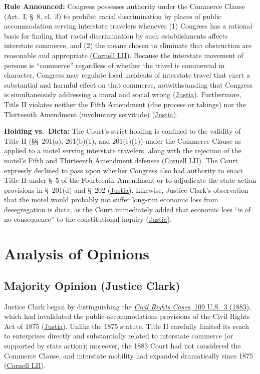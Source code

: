 \documentclass[12pt]{article}
\begin{document}
\textbf{Rule Announced:} Congress possesses authority under the Commerce Clause (Art.\ I, \S~8, cl.\ 3) to prohibit racial discrimination by places of public accommodation serving interstate travelers whenever (1) Congress has a rational basis for finding that racial discrimination by such establishments affects interstate commerce, and (2) the means chosen to eliminate that obstruction are reasonable and appropriate (\href{https://www.law.cornell.edu/supremecourt/text/379/241}{Cornell LII}). Because the interstate movement of persons is ``commerce'' regardless of whether the travel is commercial in character, Congress may regulate local incidents of interstate travel that exert a substantial and harmful effect on that commerce, notwithstanding that Congress is simultaneously addressing a moral and social wrong (\href{https://supreme.justia.com/cases/federal/us/379/241/}{Justia}). Furthermore, Title II violates neither the Fifth Amendment (due process or takings) nor the Thirteenth Amendment (involuntary servitude) (\href{https://supreme.justia.com/cases/federal/us/379/241/}{Justia}).

\textbf{Holding vs.\ Dicta:} The Court's strict holding is confined to the validity of Title II (\S\S~201(a), 201(b)(1), and 201(c)(1)) under the Commerce Clause as applied to a motel serving interstate travelers, along with the rejection of the motel's Fifth and Thirteenth Amendment defenses (\href{https://www.law.cornell.edu/supremecourt/text/379/241}{Cornell LII}). The Court expressly declined to pass upon whether Congress also had authority to enact Title II under \S~5 of the Fourteenth Amendment or to adjudicate the state-action provisions in \S~201(d) and \S~202 (\href{https://supreme.justia.com/cases/federal/us/379/241/}{Justia}). Likewise, Justice Clark's observation that the motel would probably not suffer long-run economic loss from desegregation is dicta, as the Court immediately added that economic loss ``is of no consequence'' to the constitutional inquiry (\href{https://supreme.justia.com/cases/federal/us/379/241/}{Justia}).

\section{Analysis of Opinions}

\subsection{Majority Opinion (Justice Clark)}
Justice Clark began by distinguishing the \href{https://fedsoc.org/case/the-civil-rights-cases}{\textit{Civil Rights Cases}, 109 U.S.\ 3 (1883)}, which had invalidated the public-accommodations provisions of the Civil Rights Act of 1875 (\href{https://supreme.justia.com/cases/federal/us/379/241/}{Justia}). Unlike the 1875 statute, Title II carefully limited its reach to enterprises directly and substantially related to interstate commerce (or supported by state action); moreover, the 1883 Court had not considered the Commerce Clause, and interstate mobility had expanded dramatically since 1875 (\href{https://www.law.cornell.edu/supremecourt/text/379/241}{Cornell LII}).
\end{document}
